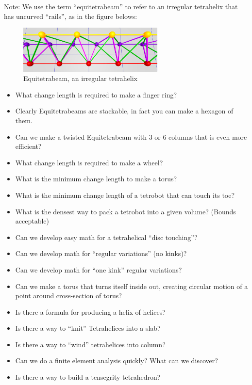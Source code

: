 \documentclass[11pt]{article}
\begin{document}
Note: We use the term ``equitetrabeam'' to refer to an irregular tetrahelix that has uncurved ``rails'', as in the figure belows:

\begin{figure}
     \centering
     \includegraphics[width=0.65\textwidth]{figures/EquitetrabeamCloseUp.png}
     \caption{Equitetrabeam, an irregular tetrahelix}
  \label{fig:equitetrabeam}
\end{figure}

\begin{itemize}
\item What change length is required to make a finger ring?
\item Clearly Equitetrabeams are stackable, in fact you can make a hexagon of them.
\item Can we make a twisted Equitetrabeam with 3 or 6 columns that is even more efficient?
\item What change length is required to make a  wheel?
\item What is the minimum change length to make a torus?
\item What is the minimum change length of a tetrobot that can touch its toe?
\item What is the densest way to pack a tetrobot into a given volume? (Bounds acceptable)
\item Can we develop easy math for a tetrahelical ``disc touching''?
\item Can we develop math for ``regular variations'' (no kinks)?
\item Can we develop math for ``one kink'' regular variations?
\item Can we make a torus that turns itself inside out, creating circular motion of a point around cross-section of torus?
\item Is there a formula for producing a helix of helices?
\item Is there a way to ``knit'' Tetrahelices into  a slab?
\item Is there a way to ``wind'' tetrahelices into column?
\item Can we do a finite element analysis quickly? What can we discover?
\item Is there a way to build a tensegrity tetrahedron?

\end{itemize}
\end{document}
